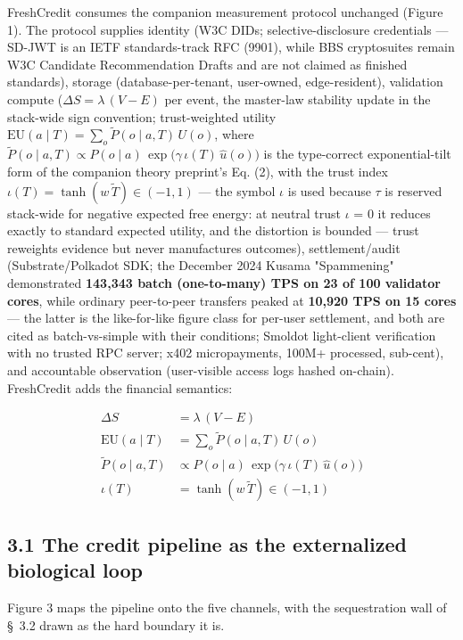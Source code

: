 \documentclass[11pt,twocolumn]{article}
\begin{document}
FreshCredit consumes the companion measurement protocol unchanged (Figure 1). The protocol supplies identity (W3C DIDs; selective-disclosure credentials --- SD-JWT is an IETF standards-track RFC (9901), while BBS cryptosuites remain W3C Candidate Recommendation Drafts and are not claimed as finished standards), storage (database-per-tenant, user-owned, edge-resident), validation compute ($\Delta S = \lambda\,(V - E)$ per event, the master-law stability update in the stack-wide sign convention; trust-weighted utility $\mathrm{EU}(a \mid T) = \sum_o \tilde{P}(o \mid a, T)\,U(o)$, where $\tilde{P}(o \mid a, T) \propto P(o \mid a)\,\exp\!\big(\gamma\,\iota(T)\,\hat{u}(o)\big)$ is the type-correct exponential-tilt form of the companion theory preprint's Eq. (2), with the trust index $\iota(T) = \tanh(w\,\tilde{T}) \in (-1, 1)$ --- the symbol $\iota$ is used because $\tau$ is reserved stack-wide for negative expected free energy: at neutral trust $\iota$ = 0 it reduces exactly to standard expected utility, and the distortion is bounded --- trust reweights evidence but never manufactures outcomes), settlement/audit (Substrate/Polkadot SDK; the December 2024 Kusama "Spammening" demonstrated \textbf{143,343 batch (one-to-many) TPS on 23 of 100 validator cores}, while ordinary peer-to-peer transfers peaked at \textbf{10,920 TPS on 15 cores} --- the latter is the like-for-like figure class for per-user settlement, and both are cited as batch-vs-simple with their conditions; Smoldot light-client verification with no trusted RPC server; x402 micropayments, 100M+ processed, sub-cent), and accountable observation (user-visible access logs hashed on-chain). FreshCredit adds the financial semantics:


\begin{align}
\Delta S &= \lambda\,(V - E) \label{eq:master}\\
\mathrm{EU}(a \mid T) &= \sum_o \tilde{P}(o \mid a, T)\,U(o) \label{eq:eu}\\
\tilde{P}(o \mid a, T) &\propto P(o \mid a)\,\exp\!\big(\gamma\,\iota(T)\,\hat{u}(o)\big) \label{eq:tilt}\\
\iota(T) &= \tanh(w\,\tilde{T}) \in (-1,1) \label{eq:iota}
\end{align}

\subsection*{3.1 The credit pipeline as the externalized biological loop}

Figure 3 maps the pipeline onto the five channels, with the sequestration wall of \S~3.2 drawn as the hard boundary it is.
\end{document}
